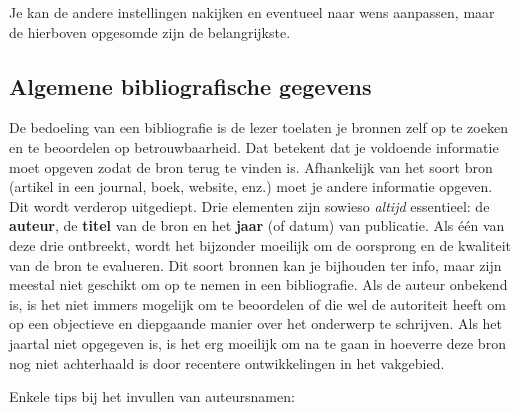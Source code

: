 Je kan de andere instellingen nakijken en eventueel naar wens aanpassen, maar de hierboven opgesomde zijn de belangrijkste.

\subsection{Algemene bibliografische gegevens}
\label{sub:algemene_bibliografische_gegevens}

De bedoeling van een bibliografie is de lezer toelaten je bronnen zelf op te zoeken en te beoordelen op betrouwbaarheid. Dat betekent dat je voldoende informatie moet opgeven zodat de bron terug te vinden is. Afhankelijk van het soort bron (artikel in een journal, boek, website, enz.) moet je andere informatie opgeven. Dit wordt verderop uitgediept. Drie elementen zijn sowieso \emph{altijd} essentieel: de \textbf{auteur}, de \textbf{titel} van de bron en het \textbf{jaar} (of datum) van publicatie. Als één van deze drie ontbreekt, wordt het bijzonder moeilijk om de oorsprong en de kwaliteit van de bron te evalueren. Dit soort bronnen kan je bijhouden ter info, maar zijn meestal niet geschikt om op te nemen in een bibliografie. Als de auteur onbekend is, is het niet immers mogelijk om te beoordelen of die wel de autoriteit heeft om op een objectieve en diepgaande manier over het onderwerp te schrijven. Als het jaartal niet opgegeven is, is het erg moeilijk om na te gaan in hoeverre deze bron nog niet achterhaald is door recentere ontwikkelingen in het vakgebied.

Enkele tips bij het invullen van auteursnamen:

